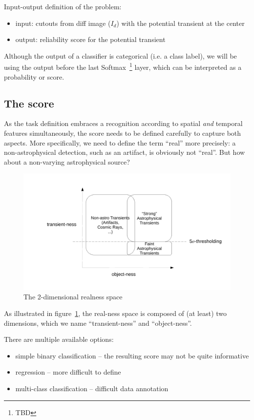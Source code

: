 Input-output definition of the problem:
\begin{itemize}
  \item input: cutouts from diff image ($I_d$) with the potential transient at the center
  \item output: reliability score for the potential transient
\end{itemize}

Although the output of a classifier is categorical (i.e. a class label), we will be using the output before the last Softmax~\footnote{TBD} layer, which can be interpreted as a probability or score.

\subsection{The score}
As the task definition embraces a recognition according to spatial \emph{and} temporal features simultaneously, the score needs to be defined carefully to capture both aspects.
More specifically, we need to define the term ``real'' more precisely: a non-astrophysical detection, such as an artifact, is obviously not ``real''. But how about a non-varying astrophysical source?

\begin{figure}[h]
  \centering
  \includegraphics[width=.8\textwidth]{material/score-space}
  \caption{The 2-dimensional realness space}
  \label{fig:score-space}
\end{figure}

As illustrated in figure~\ref{fig:score-space}, the real-ness space is composed of (at least) two dimensions, which we name ``transient-ness'' and ``object-ness''.

There are multiple available options:
\begin{itemize}
\item simple binary classification -- the resulting score may not be quite informative
\item regression -- more difficult to define
\item multi-class classification -- difficult data annotation
\end{itemize}


